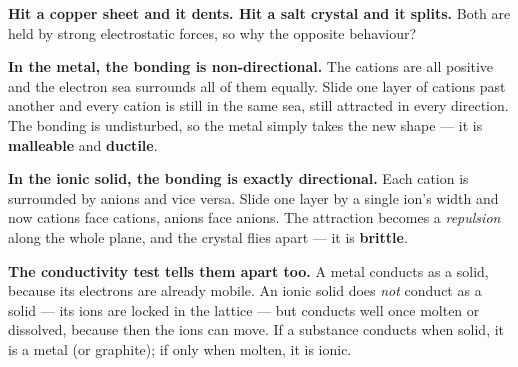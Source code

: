 \documentclass{apchem-worksheet}
\begin{document}
\begin{workedexample}
\textbf{Hit a copper sheet and it dents. Hit a salt crystal and it
splits.} Both are held by strong electrostatic forces, so why the
opposite behaviour?

\textbf{In the metal, the bonding is non-directional.} The cations are
all positive and the electron sea surrounds all of them equally. Slide
one layer of cations past another and every cation is still in the same
sea, still attracted in every direction. The bonding is undisturbed, so
the metal simply takes the new shape --- it is \textbf{malleable} and
\textbf{ductile}.

\textbf{In the ionic solid, the bonding is exactly directional.} Each
cation is surrounded by anions and vice versa. Slide one layer by a
single ion's width and now cations face cations, anions face anions. The
attraction becomes a \emph{repulsion} along the whole plane, and the
crystal flies apart --- it is \textbf{brittle}.

\textbf{The conductivity test tells them apart too.} A metal conducts as
a solid, because its electrons are already mobile. An ionic solid does
\emph{not} conduct as a solid --- its ions are locked in the lattice ---
but conducts well once molten or dissolved, because then the ions can
move. If a substance conducts when solid, it is a metal (or graphite);
if only when molten, it is ionic.
\end{workedexample}
\end{document}
